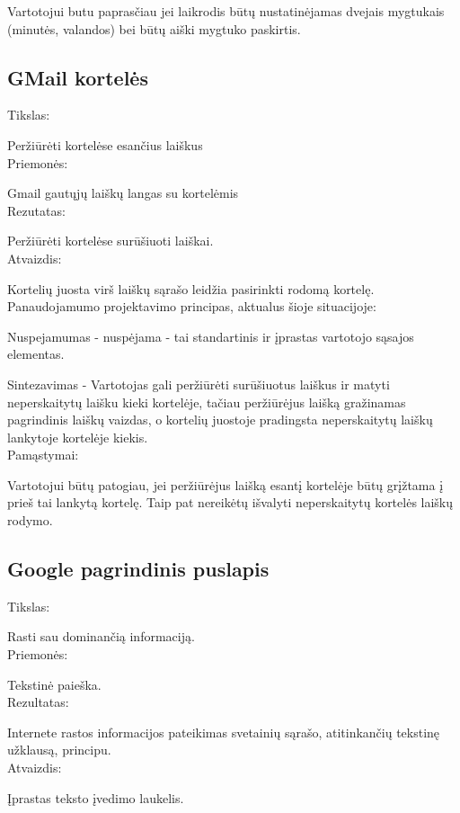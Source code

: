 ﻿\documentclass[a4paper, 12pt]{article}
\begin{document}
		Vartotojui butu paprasčiau jei laikrodis būtų nustatinėjamas dvejais mygtukais (minutės, valandos)
		bei būtų aiški mygtuko paskirtis.
		
	\subsection{GMail kortelės}
		Tikslas:
		
		Peržiūrėti kortelėse esančius laiškus\\
		Priemonės:
		
		Gmail gautųjų laiškų langas su kortelėmis\\
		Rezutatas:
		
		Peržiūrėti kortelėse surūšiuoti laiškai.\\
		Atvaizdis:
		
		Kortelių juosta virš laiškų sąrašo leidžia pasirinkti rodomą kortelę.\\
		
		Panaudojamumo projektavimo principas, aktualus šioje situacijoje:
		
		Nuspejamumas - nuspėjama - tai standartinis ir įprastas vartotojo sąsajos elementas.
		
		Sintezavimas - Vartotojas gali peržiūrėti surūšiuotus laiškus ir matyti neperskaitytų laišku kieki kortelėje, tačiau peržiūrėjus laišką
		gražinamas pagrindinis laiškų vaizdas, o kortelių juostoje pradingsta neperskaitytų laiškų lankytoje kortelėje kiekis.\\		
		Pamąstymai:
		
		Vartotojui būtų patogiau, jei peržiūrėjus laišką esantį kortelėje būtų grįžtama į prieš tai lankytą kortelę.
		Taip pat nereikėtų išvalyti neperskaitytų kortelės laiškų rodymo.

	\subsection{Google pagrindinis puslapis}
		Tikslas:

		Rasti sau dominančią informaciją.\\
		Priemonės:

		Tekstinė paieška.\\
		Rezultatas:

		Internete rastos informacijos pateikimas svetainių sąrašo, atitinkančių tekstinę užklausą, principu.\\
		Atvaizdis:

		Įprastas teksto įvedimo laukelis.\\
\end{document}
